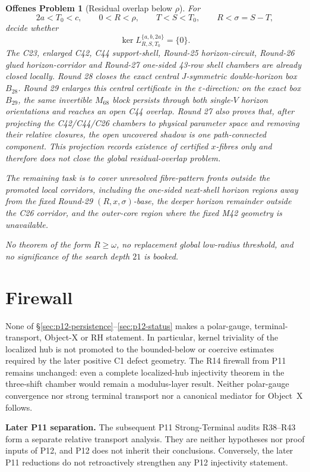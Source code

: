 \documentclass[11pt,a4paper]{amsart}
\newtheorem{openproblem}[theorem]{Offenes Problem}
\begin{document}
\begin{openproblem}[Residual overlap below \(\rho\)]
\label{open:p12-below-rho-overlap}
For
\[
2a<T_0<c,\qquad
0<R<\rho,\qquad
T<S<T_0,\qquad
R<\sigma=S-T,
\]
decide whether
\[
\ker L_{R,S,T_0}^{\{a,b,2a\}}=\{0\}.
\]
The C23, enlarged C42, C44 support-shell, Round-25 horizon-circuit,
Round-26 glued horizon-corridor and Round-27 one-sided 43-row shell chambers
are already closed locally. Round 28 closes the exact central \(J\)-symmetric
double-horizon box \(B_{28}\). Round 29 enlarges this central certificate in
the \(\varepsilon\)-direction: on the exact box \(B_{29}\), the same
invertible \(M_{68}\) block persists through both single-\(V\) horizon
orientations and reaches an open C44 overlap. Round 27 also proves that,
after projecting the C42/C44/C26 chambers to physical parameter space and
removing their relative closures, the open uncovered shadow is one
path-connected component. This projection records existence of certified
\(x\)-fibres only and therefore does not close the global residual-overlap
problem.

The remaining task is to cover unresolved fibre-pattern fronts outside the
promoted local corridors, including the one-sided next-shell horizon regions
away from the fixed Round-29 \((R,x,\sigma)\)-base, the deeper horizon
remainder outside the C26 corridor, and the outer-core region where the fixed
M42 geometry is unavailable.

No theorem of the form \(R\ge\omega\), no replacement global low-radius
threshold, and no significance of the search depth \(21\) is booked.
\end{openproblem}

\section{Firewall}\label{sec:p12-firewall}

None of \S\ref{sec:p12-persistence}--\ref{sec:p12-status} makes a
polar-gauge, terminal-transport, Object-X or RH statement. In particular,
kernel triviality of the localized hub is not promoted to the bounded-below
or coercive estimates required by the later positive C1 defect geometry. The R14 firewall
from P11 remains unchanged: even a complete localized-hub injectivity theorem
in the three-shift chamber would remain a modulus-layer result. Neither
polar-gauge convergence nor strong terminal transport nor a canonical
mediator for Object~X follows.

\medskip
\noindent
\textbf{Later P11 separation.}
The subsequent P11 Strong-Terminal audits R38--R43 form a separate relative
transport analysis. They are neither hypotheses nor proof inputs of P12, and
P12 does not inherit their conclusions. Conversely, the later P11 reductions
do not retroactively strengthen any P12 injectivity statement.
\end{document}
